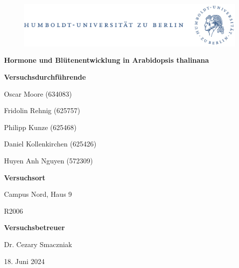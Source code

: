 \documentclass[10pt,a4paper]{article}
\begin{document}
	
	\begin{titlepage}
		\begin{center}
			\begin{figure}[h!tbp]
				\includegraphics[width=\linewidth]{HUlogo.PNG}
			\end{figure}
			\vspace*{2 cm}
			
			\textcolor{Bluetitle}{\textbf{\huge Hormone und Blütenentwicklung in Arabidopsis thalinana}}\par
			
			\vspace*{2cm}
			
			\textcolor{Greyish}{\textbf{Versuchsdurchführende}}\par
			\textcolor{Greyish}{Oscar Moore (634083)}\par
			\textcolor{Greyish}{Fridolin Rehnig (625757)}\par
			\textcolor{Greyish}{Philipp Kunze (625468)}\par
			\textcolor{Greyish}{Daniel Kollenkirchen (625426)}\par
			\textcolor{Greyish}{Huyen Anh Nguyen (572309)}\par
			
			\vspace*{0.5cm}
			\textcolor{Greyish}{\textbf{Versuchsort}}\par
			\textcolor{Greyish}{Campus Nord, Haus 9}\par
			\textcolor{Greyish}{R2006}\par
			\vspace*{0.5cm}
			\textcolor{Greyish}{\textbf{Versuchsbetreuer}}\par
			\textcolor{Greyish}{Dr. Cezary Smaczniak}\par
			
			\vspace*{2 cm}
			
			\textcolor{Greyish}{18. Juni 2024}\par
			
			
			
			
		\end{center}
	\end{titlepage}
	
\end{document}
